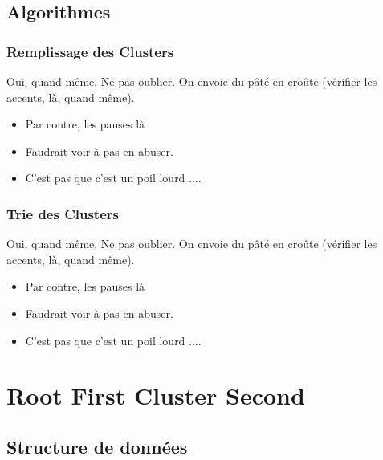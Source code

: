 \documentclass{polytech-presentation}
\begin{document}
			\subsection{Algorithmes}
			
	\begin{frame}
	\frametitle{Remplissage des Clusters}
				
		\begin{block}{Oui, quand même.}
					Ne pas oublier. On envoie du pâté en croûte (vérifier les accents, là, quand même).
		\end{block}
				
		\begin{itemize}
			\item Par contre, les pauses là \pause
			\item Faudrait voir à pas en abuser. \pause
			\item C'est pas que c'est un poil lourd ....
		\end{itemize}
				
	\end{frame}
	
		\begin{frame}
	\frametitle{Trie des Clusters}
				
		\begin{block}{Oui, quand même.}
					Ne pas oublier. On envoie du pâté en croûte (vérifier les accents, là, quand même).
		\end{block}
				
		\begin{itemize}
			\item Par contre, les pauses là \pause
			\item Faudrait voir à pas en abuser. \pause
			\item C'est pas que c'est un poil lourd ....
		\end{itemize}
				
	\end{frame}

	\section{Root First Cluster Second}
		\subsection{Structure de données}
			
\end{document}

